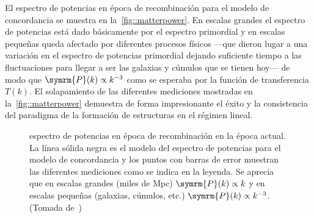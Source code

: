 El espectro de potencias en época de recombinación para el modelo de concordancia se muestra en la~\autoref{fig::matterpower}. En escalas grandes el espectro de potencias está dado básicamente por el espectro primordial y en escalas pequeñas queda afectado por diferentes procesos físicos ---que dieron lugar a una variación en el espectro de potencias primordial dejando suficiente tiempo a las fluctuaciones para llegar a ser las galaxias y cúmulos que se tienen hoy--- de modo que \(\symrm{P}(k)\propto k^{-3}\) como se esperaba por la función de transferencia \(T(k)\). El solapamiento de las diferentes mediciones mostradas en la~\autoref{fig::matterpower} demuestra de forma impresionante el éxito y la consistencia del paradigma de la formación de estructuras en el régimen lineal.
\begin{figure}[h]
    \centering
    \def\svgwidth{0.95\textwidth}
    
    \caption[espectro de potencias en época de recombinación en la época actual]{espectro de potencias en época de recombinación en la época actual. La línea sólida negra es el modelo del espectro de potencias para el modelo de concordancia y los puntos con barras de error muestran las diferentes mediciones como se indica en la leyenda. Se aprecia que en escalas grandes (miles de Mpc) \(\symrm{P}(k)\propto k\) y en escalas pequeñas (galaxias, cúmulos, etc.) \(\symrm{P}(k)\propto k^{-3}\). (Tomada de~\cite{collaboration2020planck1})}
    \label{fig::matterpower}
\end{figure}